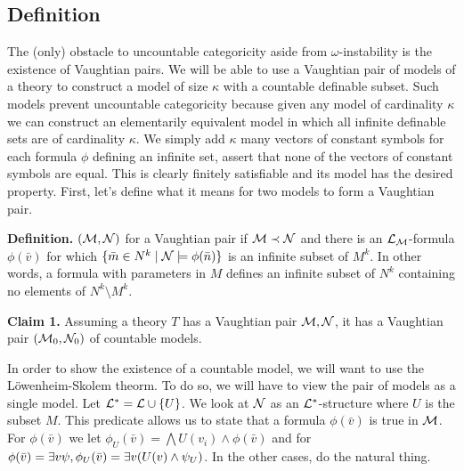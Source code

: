 \subsection{Definition}
The (only) obstacle to uncountable categoricity aside from \(\omega\)-instability is the existence of Vaughtian pairs.
We will be able to use a Vaughtian pair of models of a theory to construct a model of size \(\kappa\) with a countable definable subset.  
Such models prevent uncountable categoricity because given any model of cardinality \(\kappa\) we can construct an elementarily equivalent model in which all infinite definable sets are of cardinality \(\kappa\).
We simply add \(\kappa\) many vectors of constant symbols for each formula \(\phi\) defining an infinite set, assert that none of the vectors of constant symbols are equal. This is clearly finitely satisfiable and its model has the desired property.
First, let's define what it means for two models to form a Vaughtian pair.%


\textbf{Definition.} \((\mathcal{M}, \mathcal{N})\) for a Vaughtian pair if \(\mathcal{M} \prec \mathcal{N}\) and there is an \(\mathcal{L}_{\mathcal{M}}\)-formula \(\phi(\bar{v})\) for which
\(\{\bar{m} \in N^k \mid \mathcal{N} \models \phi(\bar{n})\}\) is an infinite subset of \(M^k\). 
In other words, a formula with parameters in \(M\) defines an infinite subset of \(N^k\) containing no elements of \(N^k \setminus M^k\).

\textbf{Claim 1.} Assuming a theory \(T\) has a Vaughtian pair \(\mathcal{M}, \mathcal{N}\), it has a Vaughtian pair \((\mathcal{M}_0, \mathcal{N}_0)\) of countable models. 

In order to show the existence of a countable model, we will want to use the L\"owenheim-Skolem theorm.
To do so, we will have to view the pair of models as a single model. 
Let  \(\mathcal{L}^* = \mathcal{L} \cup \{U\}\). 
We look at \(\mathcal{N}\) as an \(\mathcal{L}^*\)-structure where \(U\) is the subset \(M\). 
This predicate allows us to state that a formula \(\phi(\bar{v})\) is true in \(\mathcal{M}\).
For \(\phi(\bar{v})\) \qf we let \(\phi_U(\bar{v}) = \bigwedge U(v_i) \land \phi(\bar{v})\) and for \(\phi(\bar{v}) = \exists v \psi, \phi_U(\bar{v}) = \exists v (U(v) \land \psi_U)\). 
In the other cases, do the natural thing. 

